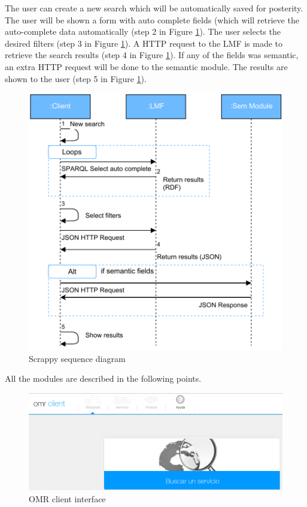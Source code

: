 The user can create a new search which will be automatically saved for posterity. The user will be shown a form with auto complete fields (which will retrieve the auto-complete data automatically (step 2 in Figure \ref{fig:clientsequence}). The user selects the desired filters (step 3 in Figure \ref{fig:clientsequence}). A HTTP request to the LMF is made to retrieve the search results (step 4 in Figure \ref{fig:clientsequence}). If any of the fields was semantic, an extra HTTP request will be done to the semantic module. The results are shown to the user (step 5 in Figure \ref{fig:clientsequence}).
\begin{figure}[h]
	\centering
	\includegraphics[width=350pt]{graphics/Diagrama_secuencia_client.pdf}
	\caption{Scrappy sequence diagram}
	\label{fig:clientsequence}
\end{figure}

All the modules are described in the following points.

\begin{figure}[ht!]
	\centering
	\includegraphics[width=460px]{graphics/omrclient.png}
	\caption{OMR client interface}
	\label{fig:omrclient}
\end{figure}



